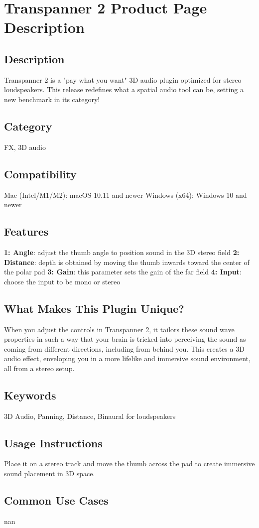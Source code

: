 \section*{Transpanner 2 Product Page Description}

\subsection*{Description}
Transpanner 2 is a "pay what you want" 3D audio plugin optimized for stereo loudspeakers. This release redefines what a spatial audio tool can be, setting a new benchmark in its category!

\subsection*{Category}
FX, 3D audio

\subsection*{Compatibility}
Mac (Intel/M1/M2): macOS 10.11 and newer
Windows (x64): Windows 10 and newer

\subsection*{Features}
\textbf{1: Angle}: adjust the thumb angle to position sound in the 3D stereo field
\textbf{2: Distance}: depth is obtained by moving the thumb inwards toward the center of the polar pad
\textbf{3: Gain}: this parameter sets the gain of the far field
\textbf{4: Input}: choose the input to be mono or stereo

\subsection*{What Makes This Plugin Unique?}
When you adjust the controls in Transpanner 2, it tailors these sound wave properties in such a way that your brain is tricked into perceiving the sound as coming from different directions, including from behind you. This creates a 3D audio effect, enveloping you in a more lifelike and immersive sound environment, all from a stereo setup.

\subsection*{Keywords}
3D Audio, Panning, Distance, Binaural for loudspeakers

\subsection*{Usage Instructions}
Place it on a stereo track and move the thumb across the pad to create immersive sound placement in 3D space. 

\subsection*{Common Use Cases}
nan